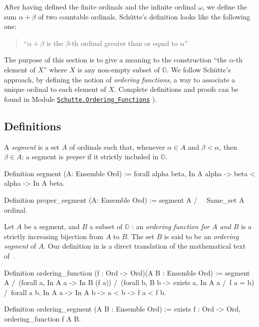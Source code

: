 \documentclass[a4paper]{book}
\begin{document}
{After having defined the finite ordinals and the infinite ordinal $\omega$, we  define the sum $\alpha+\beta$ of two countable ordinals.
Schütte's definition looks like the following one:

\begin{quote}
``$\alpha+\beta$ is the $\beta$-th ordinal greater than or equal to $\alpha$''
\end{quote}


The purpose of this section is to give a meaning to the construction
``the $\alpha$-th element of $X$''  where $X$ is any non-empty subset of $\mathbb{O}$.
We follow Schütte's approach, by defining the notion of \emph{ordering functions},
a way to associate a unique ordinal to each element of $X$.
Complete definitions and proofs can be found in Module
 \href{../src/html/hydras.Schutte.Ordering_Functions.html}%
{\texttt{Schutte.Ordering\_Functions}} ).

\subsection{Definitions}

A \emph{segment} is a set $A$ of ordinals such that, whenever  $\alpha\in A$ and
$\beta<\alpha$, then $\beta\in A$; a segment is  \emph{proper} if it strictly included in $\mathbb{O}$.

\begin{Coqsrc}
 Definition segment (A: Ensemble Ord) :=
  forall alpha beta, In A alpha -> beta < alpha -> In A  beta.

Definition proper_segment (A: Ensemble Ord) :=
  segment A /\ ~ Same_set A ordinal.
\end{Coqsrc}


Let  $A$ be a segment, and $B$ a subset of $\mathbb{O}$ : an \emph{ordering function for $A$ and  $B$} is a strictly increasing bijection from $A$ to $B$.
The set $B$ is said to be an \emph{ordering segment} of $A$.
Our definition in \coq{} is a direct translation of the mathematical text of~\cite{schutte}.


\begin{Coqsrc}
Definition ordering_function (f : Ord -> Ord)(A B : Ensemble Ord) :=
 segment A /\
 (forall a, In A a -> In B (f a)) /\
 (forall b, B b -> exists a, In A a /\ f a = b) /\
 forall a b, In A a -> In A b -> a < b ->  f a < f b.

Definition ordering_segment (A B : Ensemble Ord) :=
  exists f : Ord -> Ord, ordering_function f A B.
\end{Coqsrc}


}
\end{document}
